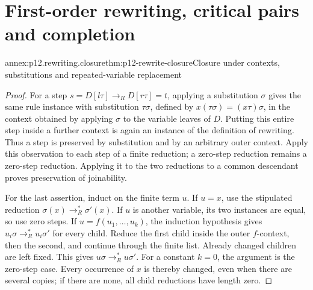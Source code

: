 \section{First-order rewriting, critical pairs and completion}

\begin{annexitem}{annex:p12.rewriting.closure}{thm:p12-rewrite-closure}{Closure under contexts, substitutions and repeated-variable replacement}
\begin{proof}
For a step \(s=D[l\tau]\to_R D[r\tau]=t\), applying a
substitution \(\sigma\) gives the same rule instance with substitution
\(\tau\sigma\), defined by
\(x(\tau\sigma)=(x\tau)\sigma\), in the context obtained by
applying \(\sigma\) to the variable leaves of \(D\).
Putting this entire step inside a further context is again an instance
of the definition of rewriting. Thus a step is preserved by substitution
and by an arbitrary outer context. Apply this observation to each step
of a finite reduction; a zero-step reduction remains a zero-step
reduction. Applying it to the two reductions to a common descendant
proves preservation of joinability.

For the last assertion, induct on the finite term \(u\). If \(u=x\),
use the stipulated reduction \(\sigma(x)\to_R^*\sigma'(x)\).
If \(u\) is another variable, its two instances are equal, so use
zero steps. If \(u=f(u_1,\ldots,u_k)\), the induction hypothesis
gives \(u_i\sigma\to_R^*u_i\sigma'\) for every child. Reduce the
first child inside the outer \(f\)-context, then the second, and
continue through the finite list. Already changed children are left
fixed. This gives \(u\sigma\to_R^*u\sigma'\). For a constant
\(k=0\), the argument is the zero-step case. Every occurrence of
\(x\) is thereby changed, even when there are several copies; if
there are none, all child reductions have length zero.
\end{proof}
\end{annexitem}

